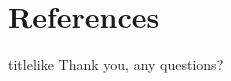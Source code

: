 \documentclass[aspectratio=169,compress]{beamer}
\begin{document}
\section*{References}

\begin{frame}[b]
  \begin{beamercolorbox}[rounded=true,shadow=true,sep=8pt]{titlelike}\centering\Large
    Thank you, any questions?
  \end{beamercolorbox}
  \begin{multicols*}{2}
    \printbibliography
  \end{multicols*}
\end{frame}
\end{document}
